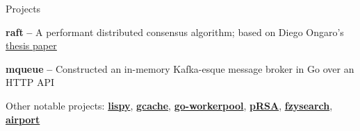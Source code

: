 \documentclass{resume} %
\begin{document}
\begin{rSection}{Projects}
  
  \begin{rProjectSection}
    \item \textbf {raft} {\textbf{--}} A performant distributed
      consensus algorithm; based on Diego Ongaro's
      \href{https://raft.github.io/raft.pdf}{\underline{thesis paper}}
    \item \textbf {mqueue} {\textbf{--}} Constructed an in-memory Kafka-esque message broker in Go
      over an HTTP API
  \end{rProjectSection}

  \begin{rBlurbSection}
    \item {Other notable projects:}
      \href{https://github.com/ridwanmsharif/lispy}{\textbf{lispy}},
      \href{https://github.com/ridwanmsharif/cache}{\textbf{gcache}},
      \href{https://github.com/ridwanmsharif/goworkerpool}{\textbf{go-workerpool}},
      \href{https://github.com/ridwanmsharif/prsa}{\textbf{pRSA}},
      \href{https://github.com/ridwanmsharif/fzysearch}{\textbf{fzysearch}},
      \href{https://github.com/ridwanmsharif/airport}{\textbf{airport}}
  \end{rBlurbSection} 
 
\end{rSection}
\end{document}
